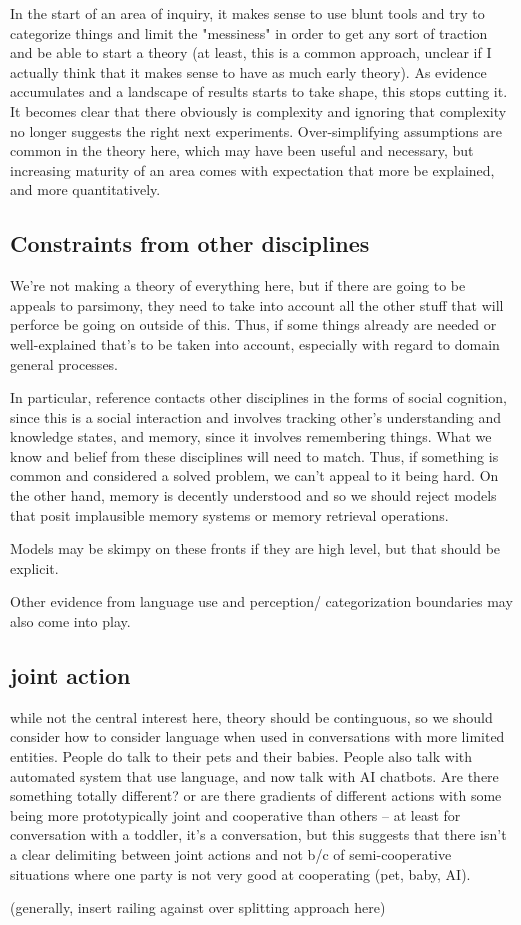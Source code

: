 \documentclass[]{article}
\begin{document}
In the start of an area of inquiry, it makes sense to use blunt tools and try to categorize things and limit the "messiness" in order to get any sort of traction and be able to start a theory (at least, this is a common approach, unclear if I actually think that it makes sense to have as much early theory). As evidence accumulates and a landscape of results starts to take shape, this stops cutting it. It becomes clear that there obviously is complexity and ignoring that complexity no longer suggests the right next experiments. Over-simplifying assumptions are common in the theory here, which may have been useful and necessary, but increasing maturity of an area comes with expectation that more be explained, and more quantitatively. 
\subsection{Constraints from other disciplines}
We're not making a theory of everything here, but if there are going to be appeals to parsimony, they need to take into account all the other stuff that will perforce be going on outside of this. Thus, if some things already are needed or well-explained that's to be  taken into account, especially with regard to domain general processes. 

In particular, reference contacts other disciplines in the forms of social cognition, since this is a social interaction and involves tracking other's understanding and knowledge states, and memory, since it involves remembering things. What we know and belief from these disciplines will need to match. Thus, if something is common and considered a solved problem, we can't appeal to it being hard. On the other hand, memory is decently understood and so we should reject models that posit implausible memory systems or memory retrieval operations. 

Models may be skimpy on these fronts if they are high level, but that should be explicit. 

Other evidence from language use and perception/ categorization boundaries may also come into play. 

\subsection{joint action}
\cite{clark1996} while not the central interest here, theory should be continguous, so we should consider how to consider language when used in conversations with more limited entities. People do talk to their pets and their babies. People also talk with automated system that use language, and now talk with AI chatbots. Are there something totally different? or are there gradients of different actions with some being more prototypically joint and cooperative than others -- at least for conversation with a toddler, it's a conversation, but this suggests that there isn't a clear delimiting between joint actions and not b/c of semi-cooperative situations where one party is not very good at cooperating (pet, baby, AI). 

(generally, insert railing against over splitting approach here)
\end{document}
